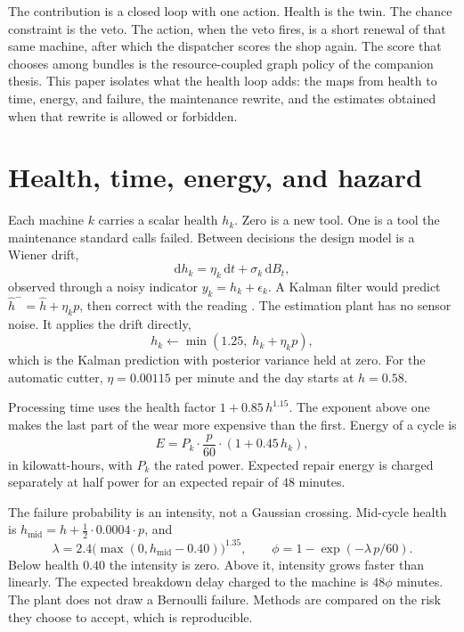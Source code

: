 \documentclass[10pt,a4paper]{article}
\begin{document}
The contribution is a closed loop with one action. Health is the twin. The chance constraint is the veto. The action, when the veto fires, is a short renewal of that same machine, after which the dispatcher scores the shop again. The score that chooses among bundles is the resource-coupled graph policy of the companion thesis. This paper isolates what the health loop adds: the maps from health to time, energy, and failure, the maintenance rewrite, and the estimates obtained when that rewrite is allowed or forbidden.

\section{Health, time, energy, and hazard}

Each machine \(k\) carries a scalar health \(h_k\). Zero is a new tool. One is a tool the maintenance standard calls failed. Between decisions the design model is a Wiener drift,
\begin{equation}
\mathrm{d}h_k = \eta_k\,\mathrm{d}t + \sigma_k\,\mathrm{d}B_t ,
\label{eq:sde}
\end{equation}
observed through a noisy indicator \(y_k = h_k + \epsilon_k\). A Kalman filter would predict \(\hat h^- = \hat h + \eta_k p\), then correct with the reading \cite{kalman1960}. The estimation plant has no sensor noise. It applies the drift directly,
\begin{equation}
h_k \leftarrow \min(1.25,\; h_k + \eta_k p),
\label{eq:wear}
\end{equation}
which is the Kalman prediction with posterior variance held at zero. For the automatic cutter, \(\eta = 0.00115\) per minute and the day starts at \(h = 0.58\).

Processing time uses the health factor \(1 + 0.85\, h^{1.15}\). The exponent above one makes the last part of the wear more expensive than the first. Energy of a cycle is
\begin{equation}
E = P_k \cdot \frac{p}{60} \cdot (1 + 0.45\, h_k),
\label{eq:energy}
\end{equation}
in kilowatt-hours, with \(P_k\) the rated power. Expected repair energy is charged separately at half power for an expected repair of \(48\) minutes.

The failure probability is an intensity, not a Gaussian crossing. Mid-cycle health is \(h_{\mathrm{mid}} = h + \tfrac12 \cdot 0.0004 \cdot p\), and
\begin{equation}
\lambda = 2.4 \big(\max(0, h_{\mathrm{mid}} - 0.40)\big)^{1.35},
\qquad
\phi = 1 - \exp(-\lambda \, p/60).
\label{eq:phi}
\end{equation}
Below health \(0.40\) the intensity is zero. Above it, intensity grows faster than linearly. The expected breakdown delay charged to the machine is \(48\phi\) minutes. The plant does not draw a Bernoulli failure. Methods are compared on the risk they choose to accept, which is reproducible.
\end{document}
